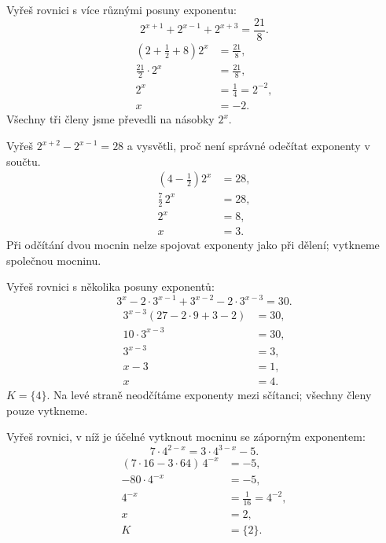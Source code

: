 \documentclass[11pt,a4paper]{article}
\begin{document}
\begin{prikladReseniBox}[title={Příklad 5}]
Vyřeš rovnici s více různými posuny exponentu:
\[2^{x+1}+2^{x-1}+2^{x+3}=\frac{21}{8}.\]
\tcblower
\[
\begin{aligned}
\left(2+\frac{1}{2}+8\right)2^x&=\frac{21}{8},\\
\frac{21}{2}\cdot2^x&=\frac{21}{8},\\
2^x&=\frac{1}{4}=2^{-2},\\
x&=-2.
\end{aligned}
\]
Všechny tři členy jsme převedli na násobky $2^x$.
\end{prikladReseniBox}
\begin{prikladReseniBox}[title={Příklad 6}]
Vyřeš $2^{x+2}-2^{x-1}=28$ a vysvětli, proč není správné odečítat exponenty v součtu.
\tcblower
\[
\begin{aligned}
\left(4-\frac{1}{2}\right)2^x&=28,\\
\frac{7}{2}\,2^x&=28,\\
2^x&=8,\\
x&=3.
\end{aligned}
\]
Při odčítání dvou mocnin nelze spojovat exponenty jako při dělení; vytkneme společnou mocninu.
\end{prikladReseniBox}

\begin{prikladReseniBox}[title={Příklad 7}]
Vyřeš rovnici s několika posuny exponentů:
\[
3^x-2\cdot3^{x-1}+3^{x-2}-2\cdot3^{x-3}=30.
\]
\tcblower
\[
\begin{aligned}
3^{x-3}(27-2\cdot9+3-2)&=30,\\
10\cdot3^{x-3}&=30,\\
3^{x-3}&=3,\\
x-3&=1,\\
x&=4.
\end{aligned}
\]
$K=\{4\}$. Na levé straně neodčítáme exponenty mezi sčítanci; všechny členy pouze vytkneme.
\end{prikladReseniBox}

\begin{prikladReseniBox}[title={Příklad 8}]
Vyřeš rovnici, v níž je účelné vytknout mocninu se záporným exponentem:
\[
7\cdot4^{2-x}=3\cdot4^{3-x}-5.
\]
\tcblower
\[
\begin{aligned}
(7\cdot16-3\cdot64)\,4^{-x}&=-5,\\
-80\cdot4^{-x}&=-5,\\
4^{-x}&=\frac{1}{16}=4^{-2},\\
x&=2,\\K&=\{2\}.
\end{aligned}
\]
\end{prikladReseniBox}
\end{document}
